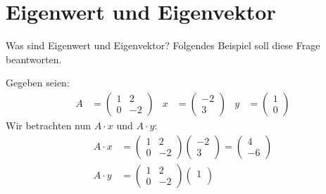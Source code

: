 

\section{Eigenwert und Eigenvektor}

Was sind Eigenwert und Eigenvektor?  Folgendes Beispiel soll diese Frage beantworten.

\begin{beispiel}
  Gegeben seien:
  \begin{align*}
    A &= \begin{pmatrix}
           1 & 2\\
           0 & -2
         \end{pmatrix}
      &x &= \begin{pmatrix}
              -2\\
              3
            \end{pmatrix}
      &y &= \begin{pmatrix}
              1\\
              0
            \end{pmatrix} 
  \end{align*}
  Wir betrachten nun $A \cdot x$ und $A \cdot y$:
  \begin{align*}
    A \cdot x &= \begin{pmatrix}
                   1 & 2\\
                   0 & -2
                 \end{pmatrix}
                 \begin{pmatrix}
                   -2\\
                   3
                 \end{pmatrix}
               = \begin{pmatrix}
                   4\\
                   -6
                 \end{pmatrix}\\
    A \cdot y &= \begin{pmatrix}
                   1 & 2\\
                   0 & -2
                 \end{pmatrix}
                 \begin{pmatrix}
                   1\\

\end{pmatrix}
\end{align*}
\end{beispiel}
